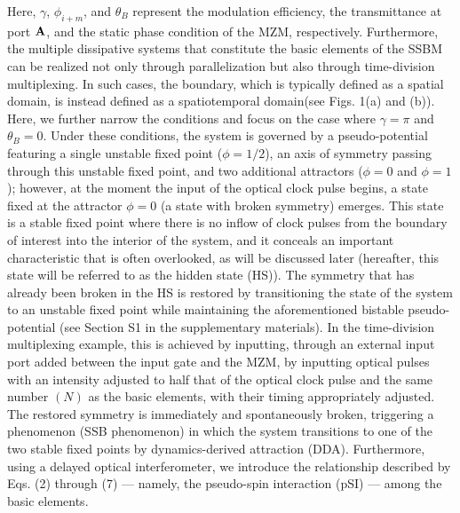 \documentclass[%
 reprint,
 amsmath,amssymb,
 aps,
]{revtex4-2}
\begin{document}
Here, $\gamma$, $\phi_{i+m}$, and $\theta_{B}$ represent the modulation efficiency, the transmittance at port $ {\bf A}$, and the static phase condition of the MZM, respectively. Furthermore, the multiple dissipative systems that constitute the basic elements of the SSBM can be realized not only through parallelization but also through time-division multiplexing. In such cases, the boundary, which is typically defined as a spatial domain, is instead defined as a spatiotemporal domain\cite{Toshiy01}(see Figs. 1(a) and (b)). Here, we further narrow the conditions and focus on the case where $\gamma \!=\! \pi$ and $\theta_{B} \!=\! 0$. Under these conditions, the system is governed by a pseudo-potential featuring a single unstable fixed point ($\phi = 1/2$), an axis of symmetry passing through this unstable fixed point, and two additional attractors ($\phi = 0$ and $\phi = 1$); however, at the moment the input of the optical clock pulse begins, a state fixed at the attractor $\phi = 0$ (a state with broken symmetry) emerges. This state is a stable fixed point where there is no inflow of clock pulses from the boundary of interest into the interior of the system, and it conceals an important characteristic that is often overlooked, as will be discussed later (hereafter, this state will be referred to as the hidden state (HS)). The symmetry that has already been broken in the HS is restored by transitioning the state of the system to an unstable fixed point while maintaining the aforementioned bistable pseudo-potential (see Section S1 in the supplementary materials). In the time-division multiplexing example, this is achieved by inputting, through an external input port added between the input gate and the MZM, by inputting optical pulses with an intensity adjusted to half that of the optical clock pulse and the same number $(N)$ as the basic elements, with their timing appropriately adjusted. The restored symmetry is immediately and spontaneously broken, triggering a phenomenon (SSB phenomenon) in which the system transitions to one of the two stable fixed points by dynamics-derived attraction (DDA). Furthermore, using a delayed optical interferometer, we introduce the relationship described by Eqs. (2) through (7) — namely, the pseudo-spin interaction (pSI) — among the basic elements.
\end{document}
